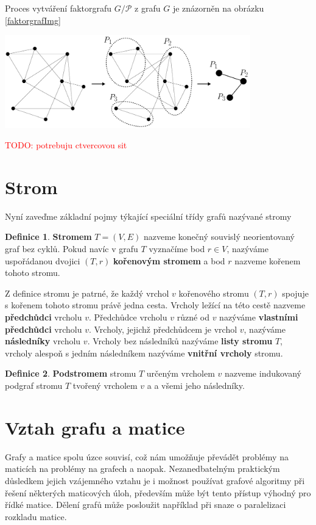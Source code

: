\documentclass[11pt,american,czech,oneside]{book}
\theoremstyle{plain}
\theoremstyle{definition}
\newtheorem{definition}{Definice}
\newcommand{\TODO}[1]{\textcolor{red}{TODO: #1}}
\begin{document}
Proces vytváření faktorgrafu $G / \mathcal{P}$ z grafu $G$ je znázorněn na obrázku \ref{faktorgrafImg}

\bigskip
{
  \centering
  \includegraphics[width=0.8\textwidth]{pictures/faktorgrafcomplete.pdf}
}

\TODO{potrebuju ctvercovou sit}

\section{Strom}

Nyní zaveďme základní pojmy týkající speciální třídy grafů nazývané stromy \cite{koub:11}

\begin{definition}
  \textbf{Stromem} $T=(V,E)$ nazveme konečný souvislý neorientovaný graf bez cyklů. Pokud navíc v grafu $T$ vyznačíme bod $r \in V$, nazýváme uspořádanou dvojici $(T,r)$ \textbf{kořenovým stromem} a bod $r$ nazveme kořenem tohoto stromu.
\end{definition}

Z definice stromu je patrné, že každý vrchol $v$ kořenového stromu $(T,r)$ spojuje s kořenem tohoto stromu právě jedna cesta.
Vrcholy ležící na této cestě nazveme \textbf{předchůdci} vrcholu $v$. Předchůdce vrcholu $v$ různé od $v$ nazýváme \textbf{vlastními předchůdci} vrcholu $v$. Vrcholy, jejichž předchůdcem je vrchol $v$, nazýváme \textbf{následníky} vrcholu $v$. Vrcholy bez následníků nazýváme \textbf{listy stromu} $T$, vrcholy alespoň s jedním následníkem nazýváme \textbf{vnitřní vrcholy} stromu.

\begin{definition}
  \textbf{Podstromem} stromu $T$ určeným vrcholem $v$ nazveme indukovaný podgraf stromu $T$ tvořený vrcholem $v$ a a všemi jeho následníky.
\end{definition}

\section{Vztah grafu a matice}
\label{GrMatRel}
Grafy a matice spolu úzce souvisí, což nám umožňuje převádět problémy na maticích na problémy na grafech a naopak. Nezanedbatelným praktickým důsledkem jejich vzájemného vztahu je i možnost používat grafové algoritmy při řešení některých maticových úloh, především může být tento přístup výhodný pro řídké matice. Dělení grafů může posloužit například při snaze o paralelizaci rozkladu matice.
\end{document}
